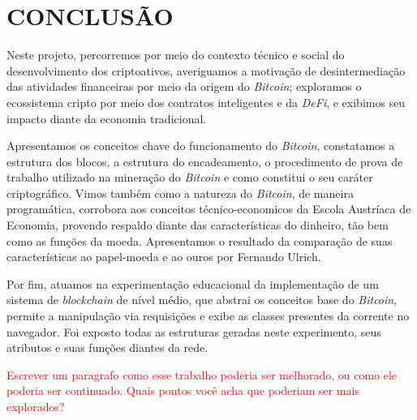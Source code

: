 \documentclass[article,12pt,oneside,a4paper,english,brazil]{unifil}
\begin{document}
\begin{Spacing}{1.5}
\begin{figure} [h]
\end{figure}



% 


\section*{CONCLUSÃO}

Neste projeto, percorremos por meio do contexto técnico e social do desenvolvimento dos criptoativos, averiguamos a motivação de desintermediação das atividades financeiras por meio da origem do \textit{Bitcoin}; exploramos o ecossistema cripto por meio dos contratos inteligentes e da \textit{DeFi}, e exibimos seu impacto diante da economia tradicional.

Apresentamos os conceitos chave do funcionamento do \textit{Bitcoin}, constatamos a estrutura dos blocos, a estrutura do encadeamento, o procedimento de prova de trabalho utilizado na mineração do \textit{Bitcoin} e como constitui o seu caráter criptográfico. Vimos também como a natureza do \textit{Bitcoin}, de maneira programática, corrobora aos conceitos técnico-economicos da Escola Austríaca de Economia, provendo respaldo diante das características do dinheiro, tão bem como as funções da moeda. Apresentamos o resultado da comparação de suas características ao papel-moeda e ao ouros por Fernando Ulrich.

Por fim, atuamos na experimentação educacional da implementação de um sistema de \textit{blockchain} de nível médio, que abstrai os conceitos base do \textit{Bitcoin}, permite a manipulação via requisições e exibe as classes presentes da corrente no navegador. Foi exposto todas as estruturas geradas neste experimento, seus atributos e suas funções diantes da rede.

\textcolor{red}{Escrever um paragrafo como esse trabalho poderia ser melhorado, ou como ele poderia ser continuado. Quais pontos você acha que poderiam ser mais explorados?}




\end{Spacing}
\postextual


\end{document}
